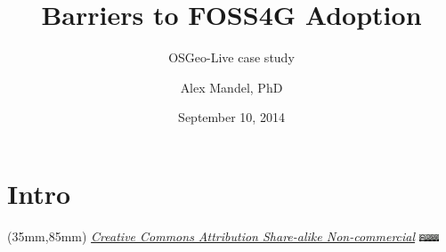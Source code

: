 \documentclass{beamer}
\title[PDFTitle]{Barriers to FOSS4G Adoption}
\subtitle[Sub]{OSGeo-Live case study}
\author[A. Mandel]{Alex Mandel, PhD} %
\institute[UCD]{
  Geography Graduate Group\\
  University of California, Davis\\
  \texttt{aimandel@ucdavis.edu}\\
  @aimandel
}
\date[Sep 2014]{September 10, 2014}
\newenvironment{reference}[2]{%
  \begin{textblock*}{\textwidth}(#1,#2) 
      \footnotesize\it\bgroup\color{black}}{\egroup\end{textblock*}}
\begin{document}
\section{Intro}
\begin{frame}[plain]
  \titlepage
   \begin{reference}{35mm}{85mm}
		\tiny \href{http://creativecommons.org/licenses/by-nc-sa/3.0/}{Creative Commons Attribution Share-alike Non-commercial}
		\includegraphics[width=22px]{cc-a-nc-sa-88x31.png}
   \end{reference} 
\end{frame}

\end{document}

